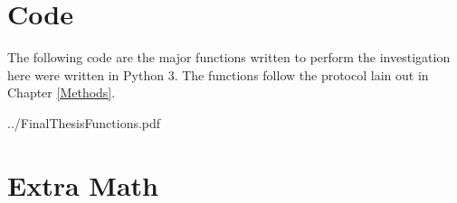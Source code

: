 \chapter{Code}
\label{AppendixA}
The following code are the major functions written to perform the investigation here were written in Python 3.  The functions follow the protocol lain out in Chapter \ref{Methods}.  



    {../FinalThesisFunctions.pdf}
    
\chapter{Extra Math} \label{AppendixB}

